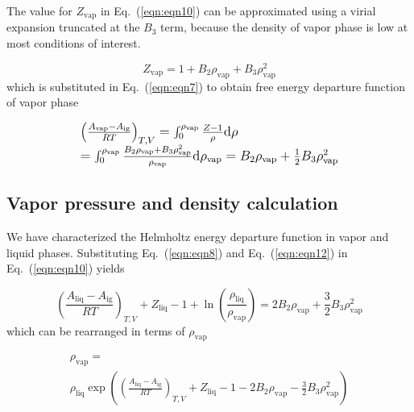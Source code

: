 \documentclass[5p,times]{elsarticle}
\begin{document}
The value for $Z_{\mathrm{vap}}$ in Eq.~(\ref{eqn:eqn10}) can be approximated using a virial expansion truncated at the $B_3$ term, because the density of vapor phase is low at most conditions of interest.

\begin{equation}
{Z_{\mathrm{vap}}} = 1 + {B_2}{\rho_{\mathrm{vap}}} + {B_3}\rho_{\mathrm{vap}}^2
\label{eqn:eqn11}
\end{equation}
which is substituted in Eq.~(\ref{eqn:eqn7}) to obtain free energy departure function of vapor phase

\begin{equation}
\begingroup
\large
\begin{array}{l}{\left( {\frac{{{A_\mathrm{vap}} - {A_\mathrm{ig}}}}{{RT}}} \right)_{T,V}} = \int_0^{{\rho _{\mathrm{vap}}}} {\frac{{Z - 1}}{\rho } \mathrm{d}\rho } \\ = \int_0^{{\rho
_{\mathrm{vap}}}} {\frac{{{B_2}{\rho _{\mathrm{vap}}} + {B_3}\rho _{\mathrm{vap}}^2}}{\rho_{\mathrm{vap}} } \mathrm{d}\rho_{\mathrm{vap}} } = {B_2}{\rho _{\mathrm{vap}}} + \frac{1}{2}{B_3}\rho _{\mathrm{vap}}^2\end{array} 
\endgroup
\label{eqn:eqn12}
\end{equation}

\subsection{Vapor pressure and density calculation}
We have characterized the Helmholtz energy departure function in vapor and liquid phases. Substituting Eq.~(\ref{eqn:eqn8}) and Eq.~(\ref{eqn:eqn12}) in Eq.~(\ref{eqn:eqn10}) yields

\begin{equation}
\left( \frac{ A_\mathrm{liq} - A_\mathrm{ig} }{{RT}} \right)_{T,V} + {Z_{\mathrm{liq}}} - 1 + \ln \left( \frac{{{\rho _{\mathrm{liq}}}}}{{{\rho _{\mathrm{vap}}}}} \right) = 2{B_2} {\rho _{\mathrm{vap}}} + \frac{3}{2}{B_3} \rho _{\mathrm{vap}}^2 \label{eqn:eqn14}
\end{equation}
which can be rearranged in terms of ${\rho_\mathrm{vap}}$ 

\begin{equation}
\begin{array}{l}
{\rho _{\mathrm{vap}} = }
\\ 
{{\rho _{\mathrm{liq}}}\exp \left( {{{\left( {\frac{{{A_\mathrm{liq}} - {A_\mathrm{ig}}}}{{RT}}} \right)}_{T,V}} + {Z_{\mathrm{liq}}} - 1 - 2{B_2} {\rho _{\mathrm{vap}}} - \frac{3}{2}{B_3} \rho _{\mathrm{vap}}^2}
\right) }  
\end{array}
\label{eqn:rhoV}
\end{equation}
\end{document}
